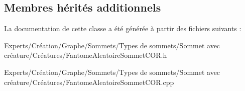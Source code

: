 \subsection*{Membres hérités additionnels}


La documentation de cette classe a été générée à partir des fichiers suivants \+:\begin{DoxyCompactItemize}
\item 
Experts/\+Création/\+Graphe/\+Sommets/\+Types de sommets/\+Sommet avec créature/\+Créatures/Fantome\+Aleatoire\+Sommet\+C\+O\+R.\+h\item 
Experts/\+Création/\+Graphe/\+Sommets/\+Types de sommets/\+Sommet avec créature/\+Créatures/Fantome\+Aleatoire\+Sommet\+C\+O\+R.\+cpp\end{DoxyCompactItemize}
